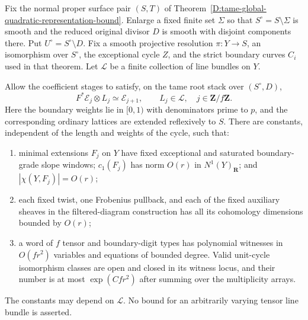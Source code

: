 \begin{proposition}
\label{D:finite-tensor-cyclic-quadratic-atlas}
Fix the normal proper surface pair $(S,T)$ of
Theorem~\ref{D:tame-global-quadratic-representation-bound}.
Enlarge a fixed finite set $\Sigma$ so that
$S^\circ=S\setminus\Sigma$ is smooth and the reduced
original divisor $D$ is smooth with disjoint components there.
Put $U^\circ=S^\circ\setminus D$.
Fix a smooth projective resolution $\pi:Y\to S$, an
isomorphism over $S^\circ$, the exceptional cycle $Z$,
and the strict boundary curves $C_i$ used in that theorem.
Let $\mathscr L$ be a finite collection of line bundles on $Y$.

Allow the coefficient stages to satisfy, on the tame root
stack over $(S^\circ,D)$,
\[
       F^*\mathcal E_j\otimes L_j
                  \simeq\mathcal E_{j+1},
       \qquad L_j\in\mathscr L,\quad j\in\mathbf Z/f\mathbf Z.
                                                        \tag{D.BZ.6}
\]
Here the boundary weights lie in $[0,1)$ with denominators
prime to $p$, and the corresponding ordinary lattices are
extended reflexively to $S$.  There are constants, independent
of the length and weights of the cycle, such that:
\begin{enumerate}
\item minimal extensions $F_j$ on $Y$ have fixed exceptional
and saturated boundary-grade slope windows; $c_1(F_j)$ has
norm $O(r)$ in $N^1(Y)_{\mathbf R}$; and
$|\chi(Y,F_j)|=O(r)$;
\item each fixed twist, one Frobenius pullback, and each of the
fixed auxiliary sheaves in the filtered-diagram construction
has all its cohomology dimensions bounded by $O(r)$;
\item a word of $f$ tensor and boundary-digit types has
polynomial witnesses in $O(fr^2)$ variables and equations of
bounded degree.  Valid unit-cycle isomorphism classes are
open and closed in its witness locus, and their number is at
most $\exp(Cfr^2)$ after summing over the multiplicity arrays.
\end{enumerate}
The constants may depend on $\mathscr L$.  No bound for
an arbitrarily varying tensor line bundle is asserted.
\end{proposition}

